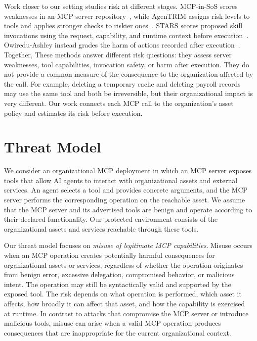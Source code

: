 \documentclass[sigconf]{acmart}
\begin{document}
Work closer to our setting studies risk at different stages. MCP-in-SoS scores
weaknesses in an MCP server repository~\cite{kumar2026mcpinsos}, while
AgenTRIM assigns risk levels to tools and applies stronger checks to riskier
ones~\cite{betser2026agentrim}. STARS scores proposed skill invocations using
the request, capability, and runtime context before
execution~\cite{zhang2026stars}. Owiredu-Ashley instead grades the harm of
actions recorded after execution~\cite{owireduashley2026severity}. Together,
These methods answer different risk questions: they assess server weaknesses,
tool capabilities, invocation safety, or harm after execution. They do not
provide a common measure of the consequence to the organization affected by
the call. For example, deleting a temporary cache and deleting payroll records
may use the same tool and both be irreversible, but their organizational impact
is very different. Our work connects each MCP call to the organization's
asset policy and estimates its risk before execution.
\section{Threat Model}
\label{threatmodel}

We consider an organizational MCP deployment in which an MCP server exposes tools that allow AI agents to interact with organizational assets and external services. An agent selects a tool and provides concrete arguments, and the MCP server performs the corresponding operation on the reachable asset. We assume that the MCP server and its advertised tools are benign and operate according to their declared functionality. Our protected environment consists of the organizational assets and services reachable through these tools.

Our threat model focuses on \emph{misuse of legitimate MCP capabilities}. Misuse occurs when an MCP operation creates potentially harmful consequences for organizational assets or services, regardless of whether the operation originates from benign error, excessive delegation, compromised behavior, or malicious intent. The operation may still be syntactically valid and supported by the exposed tool. The risk depends on what operation is performed, which asset it affects, how broadly it can affect that asset, and how the capability is exercised at runtime. In contrast to attacks that compromise the MCP server or introduce malicious tools, misuse can arise when a valid MCP operation produces consequences that are inappropriate for the current organizational context.
\end{document}
